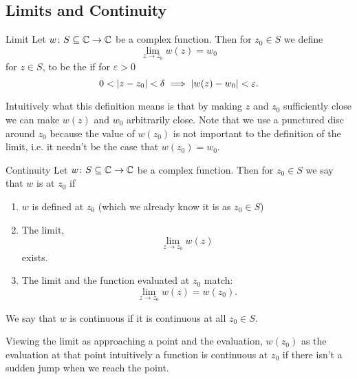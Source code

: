 \documentclass{article}
\begin{document}
    \subsection{Limits and Continuity}
    \begin{definition}{Limit}{}
        Let \(w\colon S\subseteq\mathbb{C} \to\mathbb{C}\) be a complex function.
        Then for \(z_0\in S\) we define
        \[\lim_{z\to z_0}w(z) = w_0\]
        for \(z\in S\), to be the  if for \(\varepsilon > 0\)
        \[0 < \abs{z - z_0} < \delta \implies \abs{w(z) - w_0} <\varepsilon.\]
    \end{definition}
    Intuitively what this definition means is that by making \(z\) and \(z_0\) sufficiently close we can make \(w(z)\) and \(w_0\) arbitrarily close.
    Note that we use a punctured disc around \(z_0\) because the value of \(w(z_0)\) is not important to the definition of the limit, i.e. it needn't be the case that \(w(z_0) = w_0\).
    
    \begin{definition}{Continuity}{}
        Let \(w\colon S\subseteq\mathbb{C}\to\mathbb{C}\) be a complex function.
        Then for \(z_0\in S\) we say that \(w\) is  at \(z_0\) if
        \begin{enumerate}
            \item \(w\) is defined at \(z_0\) (which we already know it is as \(z_0\in S\))
            \item The limit, 
            \[\lim_{z\to z_0}w(z)\]
            exists.
            \item The limit and the function evaluated at \(z_0\) match:
            \[\lim_{z\to z_0} w(z) = w(z_0).\]
        \end{enumerate}
        We say that \(w\) is continuous if it is continuous at all \(z_0\in S\).
    \end{definition}
    Viewing the limit as approaching a point and the evaluation, \(w(z_0)\) as the evaluation at that point intuitively a function is continuous at \(z_0\) if there isn't a sudden jump when we reach the point.
    
\end{document}
